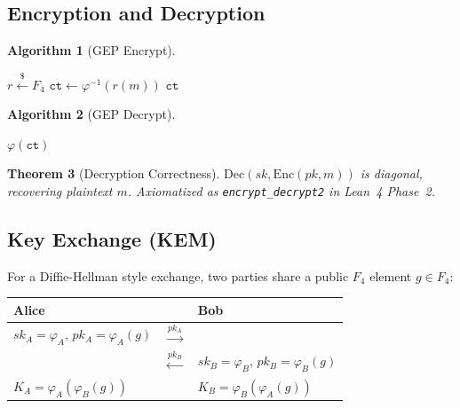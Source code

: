 \documentclass[11pt,letterpaper]{article}
\newtheorem{theorem}{Theorem}[section]
\theoremstyle{definition}
\newtheorem{algorithm_spec}[theorem]{Algorithm}
\begin{document}
\subsection{Encryption and Decryption}

\begin{algorithm_spec}[GEP Encrypt]\label{alg:encrypt}
\begin{algorithmic}[1]
\State $r \stackrel{\$}{\leftarrow} F_4$ 
\State $\mathtt{ct} \leftarrow \varphi^{-1}(r(m))$ 
\State \Return $\mathtt{ct}$
\end{algorithmic}
\end{algorithm_spec}

\begin{algorithm_spec}[GEP Decrypt]\label{alg:decrypt}
\begin{algorithmic}[1]
\State \Return $\varphi(\mathtt{ct})$
\end{algorithmic}
\end{algorithm_spec}

\begin{theorem}[Decryption Correctness]
$\mathrm{Dec}(sk, \mathrm{Enc}(pk, m))$ is diagonal, recovering plaintext $m$.
Axiomatized as \texttt{encrypt\_decrypt2} in Lean~4 Phase~2.
\end{theorem}

\subsection{Key Exchange (KEM)}

For a Diffie-Hellman style exchange, two parties share a public $F_4$ element
$g \in F_4$:

\begin{center}
\begin{tabular}{lll}
\toprule
Alice & & Bob \\
\midrule
$sk_A = \varphi_A$, $pk_A = \varphi_A(g)$ &$\xrightarrow{pk_A}$& \\
& $\xleftarrow{pk_B}$ & $sk_B = \varphi_B$, $pk_B = \varphi_B(g)$ \\
$K_A = \varphi_A(\varphi_B(g))$ & & $K_B = \varphi_B(\varphi_A(g))$ \\
\bottomrule
\end{tabular}
\end{center}
\end{document}
